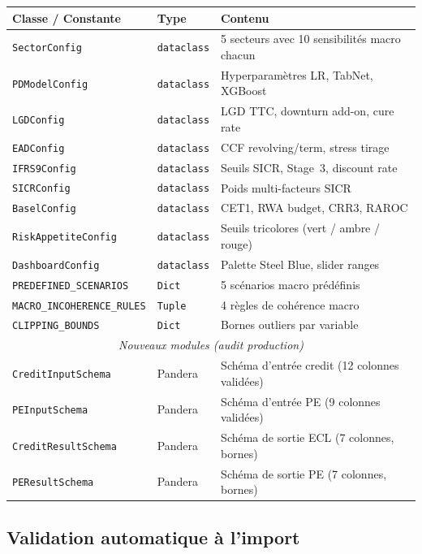 \documentclass[12pt,a4paper]{article}
\begin{document}
\begin{center}
\begin{tabular}{llp{6cm}}
\toprule
\textbf{Classe / Constante} & \textbf{Type} & \textbf{Contenu} \\
\midrule
\texttt{SectorConfig} & \texttt{dataclass} & 5 secteurs avec 10 sensibilit\'es macro chacun \\
\texttt{PDModelConfig} & \texttt{dataclass} & Hyperparamètres LR, TabNet, XGBoost \\
\texttt{LGDConfig} & \texttt{dataclass} & LGD TTC, downturn add-on, cure rate \\
\texttt{EADConfig} & \texttt{dataclass} & CCF revolving/term, stress tirage \\
\texttt{IFRS9Config} & \texttt{dataclass} & Seuils SICR, Stage~3, discount rate \\
\texttt{SICRConfig} & \texttt{dataclass} & Poids multi-facteurs SICR \\
\texttt{BaselConfig} & \texttt{dataclass} & CET1, RWA budget, CRR3, RAROC \\
\texttt{RiskAppetiteConfig} & \texttt{dataclass} & Seuils tricolores (vert / ambre / rouge) \\
\texttt{DashboardConfig} & \texttt{dataclass} & Palette Steel Blue, slider ranges \\
\texttt{PREDEFINED\_SCENARIOS} & \texttt{Dict} & 5 sc\'enarios macro pr\'ed\'efinis \\
\texttt{MACRO\_INCOHERENCE\_RULES} & \texttt{Tuple} & 4 r\`egles de coh\'erence macro \\
\texttt{CLIPPING\_BOUNDS} & \texttt{Dict} & Bornes outliers par variable \\
\midrule
\multicolumn{3}{c}{\textit{Nouveaux modules (audit production)}} \\
\midrule
\texttt{CreditInputSchema} & Pandera & Sch\'ema d'entr\'ee credit (12 colonnes valid\'ees) \\
\texttt{PEInputSchema} & Pandera & Sch\'ema d'entr\'ee PE (9 colonnes valid\'ees) \\
\texttt{CreditResultSchema} & Pandera & Sch\'ema de sortie ECL (7 colonnes, bornes) \\
\texttt{PEResultSchema} & Pandera & Sch\'ema de sortie PE (7 colonnes, bornes) \\
\bottomrule
\end{tabular}
\end{center}

\subsection{Validation automatique \`a l'import}
\end{document}
